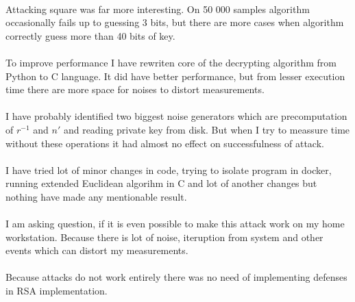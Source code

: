 \documentclass[thesis=B,english]{FITthesis}[2012/10/20]
\begin{document}
{{\paragraph*{}{
Attacking square was far more interesting. On 50 000 samples algorithm occasionally fails up to guessing 3 bits, but there are more cases when algorithm correctly guess more than 40 bits of key.		
}

\paragraph*{}{
To improve performance I have rewriten core of the decrypting algorithm from Python to C language. It did have better performance, but from lesser execution time there are more space for noises to distort measurements.
}



\paragraph*{}{
I have probably identified two biggest noise generators which are precomputation of \(r^{-1}\) and \(n'\) and reading private key from disk. But when I try to meassure time without these operations it had almost no effect on successfulness of attack.
}

\paragraph*{}{
I have tried lot of minor changes in code, trying to isolate program in docker, running extended Euclidean algorihm in C and lot of another changes but nothing have made any mentionable result.
}

\paragraph*{}
{I am asking question, if it is even possible to make this attack work on my home workstation. Because there is lot of noise, iteruption from system and other events which can distort my measurements.
}

\paragraph*{}{
Because attacks do not work entirely there was no need of implementing defenses in RSA implementation.
}




\appendix

}}
\end{document}
